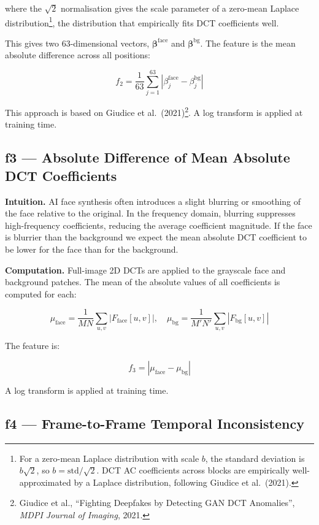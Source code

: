 \documentclass{article}
\begin{document}
where the $\sqrt{2}$ normalisation gives the scale parameter of a zero-mean Laplace distribution\footnote{For a zero-mean Laplace distribution with scale $b$, the standard deviation is $b\sqrt{2}$, so $b = \text{std}/\sqrt{2}$. DCT AC coefficients across blocks are empirically well-approximated by a Laplace distribution, following Giudice et al.\ (2021).}, the distribution that empirically fits DCT coefficients well.

This gives two 63-dimensional vectors, $\boldsymbol{\beta}^{\text{face}}$ and $\boldsymbol{\beta}^{\text{bg}}$. The feature is the mean absolute difference across all positions:

\[
  f_2 = \frac{1}{63} \sum_{j=1}^{63} \left| \beta_j^{\text{face}} - \beta_j^{\text{bg}} \right|
\]

This approach is based on Giudice et al.\ (2021)\footnote{Giudice et al., ``Fighting Deepfakes by Detecting GAN DCT Anomalies'', \textit{MDPI Journal of Imaging}, 2021.}. A log transform is applied at training time.

\subsection*{f3 — Absolute Difference of Mean Absolute DCT Coefficients}

\textbf{Intuition.} AI face synthesis often introduces a slight blurring or smoothing of the face relative to the original. In the frequency domain, blurring suppresses high-frequency coefficients, reducing the average coefficient magnitude. If the face is blurrier than the background we expect the mean absolute DCT coefficient to be lower for the face than for the background.

\textbf{Computation.} Full-image 2D DCTs are applied to the grayscale face and background patches. The mean of the absolute values of all coefficients is computed for each:

\[
  \mu_{\text{face}} = \frac{1}{MN}\sum_{u,v} |F_{\text{face}}[u,v]|, \quad
  \mu_{\text{bg}} = \frac{1}{M'N'}\sum_{u,v} |F_{\text{bg}}[u,v]|
\]

The feature is:

\[
  f_3 = |\mu_{\text{face}} - \mu_{\text{bg}}|
\]

A log transform is applied at training time.

\subsection*{f4 — Frame-to-Frame Temporal Inconsistency}
\end{document}
